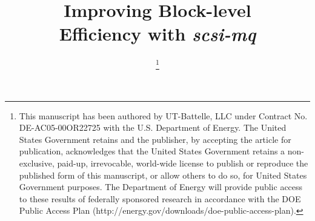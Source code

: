 \documentclass[conference]{IEEEtran}
\begin{document}
\title{Improving Block-level \\ Efficiency with \emph{scsi-mq}}

\author{
\thanks{
This manuscript has been authored by UT-Battelle, LLC under Contract No. DE-AC05-00OR22725 with the U.S. Department of Energy. The United States Government retains and the publisher, by accepting the article for publication, acknowledges that the United States Government retains a non-exclusive, paid-up, irrevocable, world-wide license to publish or reproduce the published form of this manuscript, or allow others to do so, for United States Government purposes. The Department of Energy will provide public access to these results of federally sponsored research in accordance with the DOE Public Access Plan (http://energy.gov/downloads/doe-public-access-plan).
}
}













\maketitle
\end{document}
